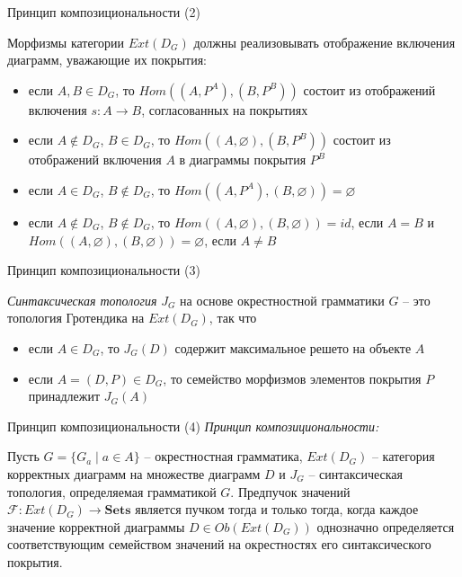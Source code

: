 \documentclass{beamer}
\begin{document}
\begin{frame}{Принцип композициональности (2)}
\begin{small}
Морфизмы категории $Ext(D_G)$ должны реализовывать отображение включения диаграмм, уважающие их покрытия:\\
\medskip
\begin{itemize}
	\item если $A, B \in D_G$, то $Hom((A, P^A), (B, P^B))$ состоит из отображений включения $s : A \to B$, согласованных на покрытиях
	\item если $A \notin D_G$, $B \in D_G$, то $Hom((A, \varnothing), (B, P^B))$ состоит из отображений включения $A$ в диаграммы покрытия $P^B$
	\item если $A \in D_G$, $B \notin D_G$, то $Hom((A, P^A), (B, \varnothing)) = \varnothing$
	\item если $A \notin D_G$, $B \notin D_G$, то $Hom((A, \varnothing), (B, \varnothing)) = id$, если $A = B$ и $Hom((A, \varnothing), (B, \varnothing)) = \varnothing$, если $A \neq B$
\end{itemize}
\end{small}
\end{frame}

\begin{frame}{Принцип композициональности (3)}
\begin{small}
\textit{Синтаксическая топология} $J_G$ на основе окрестностной грамматики $G$ -- это топология Гротендика на $Ext(D_G)$, так что\\
\medskip
\begin{itemize}
	\item если $A \in D_G$, то $J_G(D)$ содержит максимальное решето на объекте $A$
	\item если $A = (D, P) \in D_G$, то семейство морфизмов элементов покрытия $P$ принадлежит $J_G(A)$
\end{itemize}
\end{small}
\end{frame}

\begin{frame}{Принцип композициональности (4)}
\textit{Принцип композициональности:}\\
\medskip
\begin{block}{}
\justifying
\begin{small}
Пусть $G = \{ G_a \; \vert \; a \in A \}$ -- окрестностная грамматика, $Ext(D_G)$ -- категория корректных диаграмм на множестве диаграмм $D$ и $J_G$ -- синтаксическая топология, определяемая грамматикой $G$. Предпучок значений $\mathcal{F} : Ext(D_G) \to \textbf{Sets}$ является пучком тогда и только тогда, когда каждое значение корректной диаграммы $D \in Ob(Ext(D_G))$ однозначно определяется соответствующим семейством значений на окрестностях его синтаксического покрытия.
\end{small}
\end{block}
\end{frame}
\end{document}
